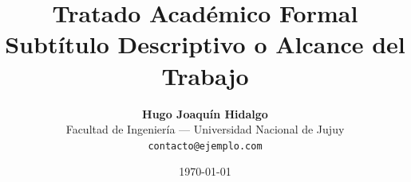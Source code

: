 %

\documentclass[11pt,a4paper]{article}

\usepackage[utf8]{inputenc}
\usepackage[T1]{fontenc}
\usepackage[spanish,es-tabla,es-noquoting]{babel}

\usepackage{geometry}
\geometry{
    top=2.5cm,
    bottom=2.5cm,
    left=2.5cm,
    right=2.5cm
}

\usepackage{amsmath,amssymb,amsfonts}

\usepackage{graphicx}
\usepackage{booktabs}
\usepackage{tabularx}
\usepackage{xcolor}

\usepackage{microtype}

\usepackage{hyperref}

\title{\vspace{-1cm}\textbf{\LARGE Tratado Académico Formal}\\[0.5em] \large Subtítulo Descriptivo o Alcance del Trabajo}
\author{\textbf{Hugo Joaquín Hidalgo}\\[0.2em]
\small Facultad de Ingeniería --- Universidad Nacional de Jujuy\\
\small \texttt{contacto@ejemplo.com}}
\date{\today}

